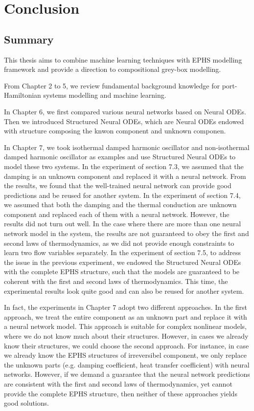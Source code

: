 \documentclass[
	parskip, 			   %
	twoside, 			   %
	DIV=14, 			   %
	BCOR=15.0mm, 		   %
	headsepline, 		   %
	open=right, 		   %
	captions=tableheading, %
	bibliography=totoc,    %
	numbers=noenddot       %
]{scrreprt}
\begin{document}
\begin{figure}[h!]
    \label{fig:ndho_experiment_with_EPHS_structure_reuse}
\end{figure}

\clearpage
\chapter{Conclusion}
\label{ch:chapter8}
\section{Summary}
This thesis aims to combine machine learning techniques with EPHS modelling framework and provide a direction to compositional grey-box modelling. 

From Chapter 2 to 5, we review fundamental background knowledge for port-Hamiltonian systems modelling and machine learning. 

In Chapter 6, we first compared various neural networks based on Neural ODEs. Then we introduced Structured Neural ODEs, which are Neural ODEs endowed with structure composing the knwon component and unknown componen. 

In Chapter 7, we took isothermal damped harmonic oscillator and non-isothermal damped harmonic oscillator as examples and use Structured Neural ODEs to model these two systems. In the experiment of section 7.3, we assumed that the damping is an unknown component and replaced it with a neural network. From the results, we found that the well-trained neural network can provide good predictions and be reused for another system. In the experiment of section 7.4, we assumed that both the damping and the thermal conduction are unknown component and replaced each of them with a neural network. However, the results did not turn out well. In the case where there are more than one neural network model in the system, the results are not guaranteed to obey the first and second laws of thermodynamics, as we did not provide enough constraints to learn two flow variables separately. In the experiment of section 7.5, to address the issue in the previous experiment, we endowed the Structured Neural ODEs with the complete EPHS structure, such that the models are guaranteed to be coherent with the first and second laws of thermodynamics. This time, the experimental results look quite good and can also be reused for another system.

In fact, the experiments in Chapter 7 adopt two different approaches. In the first approach, we treat the entire component as an unknown part and replace it with a neural network model. This approach is suitable for complex nonlinear models, where we do not know much about their structures. However, in cases we already know their structures, we could choose the second approach. For instance, in case we already know the EPHS structures of irreversibel component, we only replace the unknown parts (e.g. damping coefficient, heat transfer coefficient) with neural networks. However, if we demand a guarantee that the neural network predictions are consistent with the first and second laws of thermodynamics, yet cannot provide the complete EPHS structure, then neither of these approaches yields good solutions.
\end{document}
